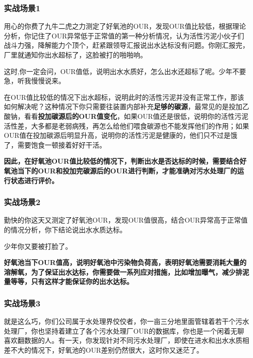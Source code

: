 \documentclass[
]{book}
\begin{document}
\hypertarget{ux5b9eux6218ux573aux666f1}{%
\subsubsection{实战场景1}\label{ux5b9eux6218ux573aux666f1}}

用心的你费了九牛二虎之力测定了好氧池的OUR，发现OUR值比较低，根据理论分析，你记住了OUR异常低于正常值的第一种分析情况，认为活性污泥小伙子们战斗力强，降解能力个顶个，赶紧跟领导汇报说出水达标没有问题。你刚汇报完，厂里就通知你出水超标了，这脸被打的啪啪响。

这时,你一定会问，OUR值低，说明出水水质好，怎么出水还超标了呢。少年不要急，听我慢慢说来。

在OUR值比较低的情况下出水超标，说明此时的活性污泥并没有正常工作，那该如何解决呢？这种情况下你只需要往装置内部补充\textbf{足够的碳源}，最常见的是投加乙酸钠，看看\textbf{投加碳源后的OUR值变化}，如果OUR值还是很低，说明你的活性污泥活性差，大多都是老弱病残，再怎么给他们喂食碳源也不能发挥他们的作用；如果OUR值在投加碳源后明显升高，说明你的活性污泥是健康的，他们只不过是饿了，需要饱食一顿接着好好干活。

\textbf{因此，在好氧池OUR值比较低的情况下，判断出水是否达标的时候，需要结合好氧池当下的OUR和投加完碳源后的OUR进行判断，才能准确对污水处理厂的运行状态进行评价。}

\hypertarget{ux5b9eux6218ux573aux666f2}{%
\subsubsection{实战场景2}\label{ux5b9eux6218ux573aux666f2}}

勤快的你这天又测定了好氧池OUR，发现OUR值很高，结合OUR异常高于正常值的情况分析，你下结论说出水水质达标。

少年你又要被打脸了。

\textbf{好氧池当下OUR值高，说明好氧池中污染物负荷高，表明好氧池需要消耗大量的溶解氧，为了保证出水达标，你需要做一系列应对措施，比如增加曝气，减少排泥量等等，只有这样才能保证你的出水达标。}

\hypertarget{ux5b9eux6218ux573aux666f3}{%
\subsubsection{实战场景3}\label{ux5b9eux6218ux573aux666f3}}

就是这么巧，你们公司属于水处理界佼佼者，你一亩三分地里面管辖着若干个污水处理厂，你也坚持着建立了各个污水处理厂OUR的数据库，你也是一个闲着无聊喜欢翻数据的人。有一天，你发现针对不同污水处理厂，即使在进水和出水水质相差不大的情况下，好氧池的OUR差别仍然很大，这时你又迷茫了。
\end{document}
